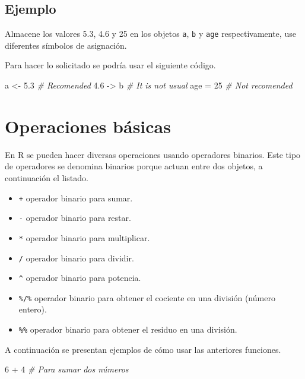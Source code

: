 \documentclass[10pt,]{krantz}
\makeatletter
\newenvironment{Shaded}{\begin{snugshade}}{\end{snugshade}}
\newcommand{\DecValTok}[1]{\textcolor[rgb]{0.00,0.00,0.81}{{#1}}}
\newcommand{\FloatTok}[1]{\textcolor[rgb]{0.00,0.00,0.81}{{#1}}}
\newcommand{\StringTok}[1]{\textcolor[rgb]{0.31,0.60,0.02}{{#1}}}
\newcommand{\CommentTok}[1]{\textcolor[rgb]{0.56,0.35,0.01}{\textit{{#1}}}}
\newcommand{\NormalTok}[1]{{#1}}
\providecommand{\tightlist}{%
  \setlength{\itemsep}{0pt}\setlength{\parskip}{0pt}}
\let\proglang=\textsf
\newenvironment{kframe}{%
\medskip{}
\setlength{\fboxsep}{.8em}
 \def\at@end@of@kframe{}%
 \ifinner\ifhmode%
  \def\at@end@of@kframe{\end{minipage}}%
  \begin{minipage}{\columnwidth}%
 \fi\fi%
 \def\FrameCommand##1{\hskip\@totalleftmargin \hskip-\fboxsep
 \colorbox{shadecolor}{##1}\hskip-\fboxsep
     \hskip-\linewidth \hskip-\@totalleftmargin \hskip\columnwidth}%
 \MakeFramed {\advance\hsize-\width
   \@totalleftmargin\z@ \linewidth\hsize
   \@setminipage}}%
 {\par\unskip\endMakeFramed%
 \at@end@of@kframe}
\renewenvironment{Shaded}{\begin{kframe}}{\end{kframe}}
\makeatother
\begin{document}
\subsection*{Ejemplo}\label{ejemplo-13}


Almacene los valores 5.3, 4.6 y 25 en los objetos \texttt{a}, \texttt{b}
y \texttt{age} respectivamente, use diferentes símbolos de asignación.

Para hacer lo solicitado se podría usar el siguiente código.

\begin{Shaded}
\begin{Highlighting}[]
\NormalTok{a <-}\StringTok{ }\FloatTok{5.3} \CommentTok{# Recomended}
\FloatTok{4.6} \NormalTok{->}\StringTok{ }\NormalTok{b }\CommentTok{# It is not usual}
\NormalTok{age =}\StringTok{ }\DecValTok{25} \CommentTok{# Not recomended}
\end{Highlighting}
\end{Shaded}

\section{\texorpdfstring{Operaciones básicas
}{Operaciones básicas }}\label{operaciones-basicas}

En \proglang{R} se pueden hacer diversas operaciones usando operadores
binarios. Este tipo de operadores se denomina binarios porque actuan
entre dos objetos, a continuación el listado.

\begin{itemize}
\tightlist
\item
  \texttt{+} operador binario para sumar.
\item
  \texttt{-} operador binario para restar.
\item
  \texttt{*} operador binario para multiplicar.
\item
  \texttt{/} operador binario para dividir.
\item
  \texttt{\^{}} operador binario para potencia.
\item
  \texttt{\%/\%} operador binario para obtener el cociente en una
  división (número entero).
\item
  \texttt{\%\%} operador binario para obtener el residuo en una
  división.
\end{itemize}

A continuación se presentan ejemplos de cómo usar las anteriores
funciones.

\begin{Shaded}
\begin{Highlighting}[]
\DecValTok{6} \NormalTok{+}\StringTok{ }\DecValTok{4}  \CommentTok{# Para sumar dos números}
\end{Highlighting}
\end{Shaded}
\end{document}
